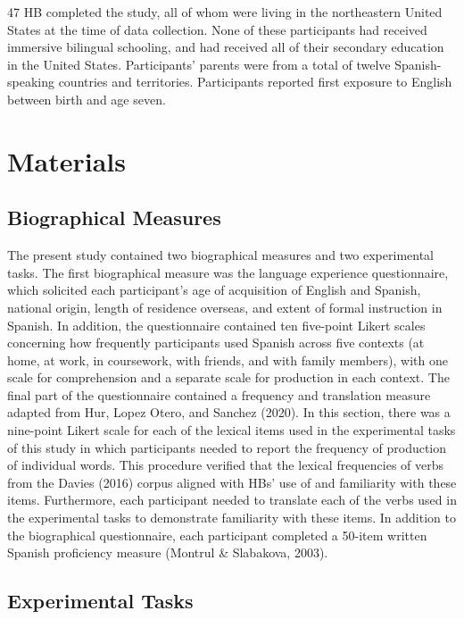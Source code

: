 \documentclass[
  english,
  man,floatsintext]{apa6}
\begin{document}
47 HB completed the study, all of whom were living in the northeastern United States at the time of data collection. None of these participants had received immersive bilingual schooling, and had received all of their secondary education in the United States. Participants' parents were from a total of twelve Spanish-speaking countries and territories. Participants reported first exposure to English between birth and age seven.

\hypertarget{materials}{%
\section{Materials}\label{materials}}

\hypertarget{biographical-measures}{%
\subsection{Biographical Measures}\label{biographical-measures}}

The present study contained two biographical measures and two experimental tasks. The first biographical measure was the language experience questionnaire, which solicited each participant's age of acquisition of English and Spanish, national origin, length of residence overseas, and extent of formal instruction in Spanish. In addition, the questionnaire contained ten five-point Likert scales concerning how frequently participants used Spanish across five contexts (at home, at work, in coursework, with friends, and with family members), with one scale for comprehension and a separate scale for production in each context. The final part of the questionnaire contained a frequency and translation measure adapted from Hur, Lopez Otero, and Sanchez (2020). In this section, there was a nine-point Likert scale for each of the lexical items used in the experimental tasks of this study in which participants needed to report the frequency of production of individual words. This procedure verified that the lexical frequencies of verbs from the Davies (2016) corpus aligned with HBs' use of and familiarity with these items. Furthermore, each participant needed to translate each of the verbs used in the experimental tasks to demonstrate familiarity with these items. In addition to the biographical questionnaire, each participant completed a 50-item written Spanish proficiency measure (Montrul \& Slabakova, 2003).

\hypertarget{experimental-tasks}{%
\subsection{Experimental Tasks}\label{experimental-tasks}}
\end{document}
